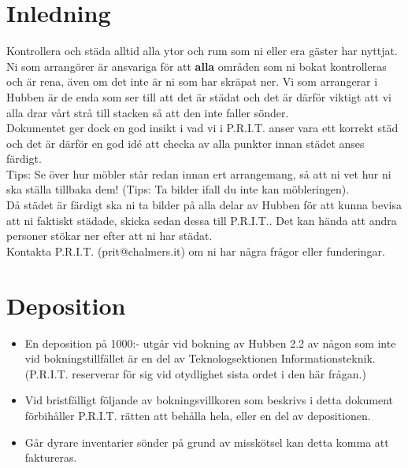 \newcommand{\deposition}{1000}

\section{Inledning}
Kontrollera och städa alltid alla ytor och rum som ni eller era gäster har nyttjat. Ni som arrangörer är ansvariga för att \textbf{alla} områden som ni bokat kontrolleras och är rena, även om det inte är ni som har skräpat ner. Vi som arrangerar i Hubben är de enda som ser till att det är städat och det är därför viktigt att vi alla drar vårt strå till stacken så att den inte faller sönder.\\

 Dokumentet ger dock en god insikt i vad vi i P.R.I.T. anser vara ett korrekt städ och det är därför en god idé att checka av alla punkter innan städet anses färdigt.\\

Tips: Se över hur möbler står redan innan ert arrangemang, så att ni vet hur ni ska ställa tillbaka dem! (Tips: Ta bilder ifall du inte kan möbleringen). \\

Då städet är färdigt ska ni ta bilder på alla delar av Hubben för att kunna bevisa att ni faktiskt städade, skicka sedan dessa till P.R.I.T.. Det kan hända att andra personer stökar ner efter att ni har städat.\\

Kontakta P.R.I.T. (prit@chalmers.it) om ni har några frågor eller funderingar.

\section{Deposition}
\begin{itemize}
    \item En deposition på \deposition :- utgår vid bokning av Hubben 2.2 av någon som inte vid bokningstillfället är en del av Teknologsektionen Informationsteknik. (P.R.I.T. reserverar för sig vid otydlighet sista ordet i den här frågan.)
    \item Vid bristfälligt följande av bokningsvillkoren som beskrivs i detta dokument förbihåller P.R.I.T. rätten att behålla hela, eller en del av depositionen.
    \item Går dyrare inventarier sönder på grund av misskötsel kan detta komma att faktureras.
\end{itemize}


